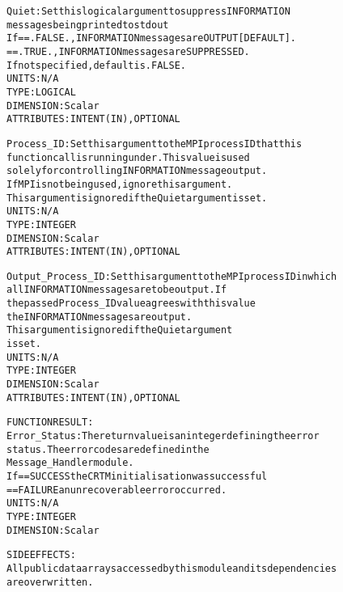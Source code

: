 \begin{alltt}
        Quiet:              Set this logical argument to suppress INFORMATION
                            messages being printed to stdout
                            If == .FALSE., INFORMATION messages are OUTPUT [DEFAULT].
                               == .TRUE.,  INFORMATION messages are SUPPRESSED.
                            If not specified, default is .FALSE.
                            UNITS:      N/A
                            TYPE:       LOGICAL
                            DIMENSION:  Scalar
                            ATTRIBUTES: INTENT(IN), OPTIONAL
 
        Process_ID:         Set this argument to the MPI process ID that this
                            function call is running under. This value is used
                            solely for controlling INFORMATION message output.
                            If MPI is not being used, ignore this argument.
                            This argument is ignored if the Quiet argument is set.
                            UNITS:      N/A
                            TYPE:       INTEGER
                            DIMENSION:  Scalar
                            ATTRIBUTES: INTENT(IN), OPTIONAL
 
        Output_Process_ID:  Set this argument to the MPI process ID in which
                            all INFORMATION messages are to be output. If
                            the passed Process_ID value agrees with this value
                            the INFORMATION messages are output.
                            This argument is ignored if the Quiet argument
                            is set.
                            UNITS:      N/A
                            TYPE:       INTEGER
                            DIMENSION:  Scalar
                            ATTRIBUTES: INTENT(IN), OPTIONAL
 
  FUNCTION RESULT:
        Error_Status:       The return value is an integer defining the error
                            status. The error codes are defined in the
                            Message_Handler module.
                            If == SUCCESS the CRTM initialisation was successful
                               == FAILURE an unrecoverable error occurred.
                            UNITS:      N/A
                            TYPE:       INTEGER
                            DIMENSION:  Scalar
 
  SIDE EFFECTS:
        All public data arrays accessed by this module and its dependencies
        are overwritten.
 
  \end{alltt}
